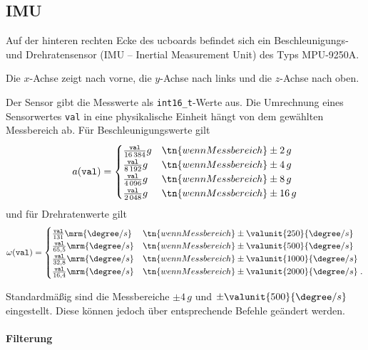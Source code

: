 \subsection{IMU}

Auf der hinteren rechten Ecke des ucboards befindet sich ein Beschleunigungs- und Drehratensensor (IMU -- Inertial Measurement Unit) des Typs MPU-9250A.

Die $x$-Achse zeigt nach vorne, die $y$-Achse nach links und die $z$-Achse nach oben.

Der Sensor gibt die Messwerte als \texttt{int16\_t}-Werte aus. Die Umrechnung eines Sensorwertes \texttt{val} in eine physikalische Einheit hängt von dem gewählten Messbereich ab. Für Beschleunigungswerte gilt
\begin{align}
	a(\mathtt{val})
		=
			\begin{cases}
				\frac{\mathtt{val}}{16\,384} g & \tn{wenn Messbereich } \pm 2\,g \\
				\frac{\mathtt{val}}{8\,192} g & \tn{wenn Messbereich } \pm 4\,g \\
				\frac{\mathtt{val}}{4\,096} g & \tn{wenn Messbereich } \pm 8\,g \\
				\frac{\mathtt{val}}{2\,048} g & \tn{wenn Messbereich } \pm 16\,g 
			\end{cases}
	\label{eq:hw:IMU:ACCScale}
\end{align}
und für Drehratenwerte gilt
\begin{align}
	\omega(\mathtt{val})
		=
			\begin{cases}
				\frac{\mathtt{val}}{131} \mrm{\degree / s} & \tn{wenn Messbereich } \pm \valunit{250}{\degree / s} \\
				\frac{\mathtt{val}}{65,5} \mrm{\degree / s} & \tn{wenn Messbereich } \pm \valunit{500}{\degree / s} \\
				\frac{\mathtt{val}}{32,8} \mrm{\degree / s} & \tn{wenn Messbereich } \pm \valunit{1000}{\degree / s} \\
				\frac{\mathtt{val}}{16,4} \mrm{\degree / s} & \tn{wenn Messbereich } \pm \valunit{2000}{\degree / s}\;.
			\end{cases}
	\label{eq:hw:IMU:GYROScale}
\end{align}

Standardmäßig sind die Messbereiche $\pm 4\,g$ und $\pm \valunit{500}{\degree / s}$ eingestellt. Diese können jedoch über entsprechende Befehle geändert werden.


\paragraph{Filterung}

